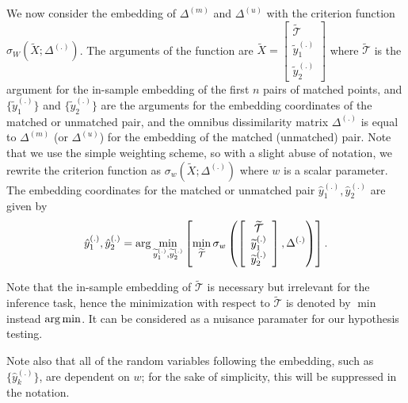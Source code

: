 \documentclass[12pt,oneside,final]{thesis}\usepackage[]{graphicx}\usepackage[]{color}
\begin{document}


 We now consider the embedding of $\Delta^{(m)}$ and $\Delta^{(u)}$ with the criterion function  $\sigma_W(\widetilde{X}; \Delta^{(.)})$. The arguments of the function are  $\widetilde{X}= \left[
\begin{array}{c}
{\widetilde{\mathcal{T}}} \\
\widetilde{y}_{1}^{(.)} \\
\widetilde{y}_{2}^{(.)}
\end {array}
\right]$ where ${\widetilde{\mathcal{T}}}$ is the argument for the in-sample embedding of the first $n$ pairs of matched points, and
 $\{\widetilde{y}_{1}^{(.)} \}$ and $\{\widetilde{y}_{2}^{(.)} \}$ are the arguments for the embedding coordinates of the matched  or unmatched pair,
and the omnibus dissimilarity matrix $\Delta^{(.)}$ is equal to  $\Delta^{(m)}$  (or $\Delta^{(u)}$) for the embedding of the  matched (unmatched) pair. Note that we use the simple weighting scheme, so with a slight abuse of notation, we rewrite the criterion function as  $\sigma_w(\widetilde{X}; \Delta^{(.)})$ where $w$ is a scalar parameter.
The embedding coordinates for the matched or unmatched pair  ${\hat{y}_{1}^{(.)},\hat{y}_{2}^{(.)}}$ are given by
 \[
{\hat{y}_{1}^{(.)},\hat{y}_{2}^{(.)}}
=\arg\min_{\widetilde{y}_{1}^{(.)}, \widetilde{y}_{2}^{(.)}}\left[\min_{\widetilde{\mathcal{T}}}
{\sigma_w\left(
\left[
\begin{array}{c}
{\widetilde{\mathcal{T}}} \\
\widetilde{y}_{1}^{(.)} \\
\widetilde{y}_{2}^{(.)}
\end {array}
\right]
,
\Delta^{(.)}
\right)
}
\right].
\]

\begin{remark}
 Note that the in-sample embedding of $\widetilde{\mathcal{T}}$ is necessary but irrelevant for the inference task, hence the minimization with respect to $\widetilde{\mathcal{T}}$ is denoted by  $\min$ instead $\arg\min$. It can be considered as a nuisance paramater for our hypothesis testing.
\end{remark}
\begin{remark}
 Note also that  all of the random variables following the embedding, such as $\{\hat{y}_{k}^{(.)}\}\!$,  are dependent on $w$; for the sake of simplicity, this will  be suppressed in the notation. 
\end{remark}
\end{document}
